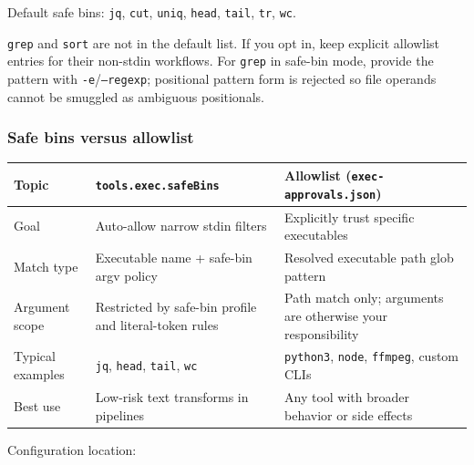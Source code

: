Default safe bins: \texttt{jq}, \texttt{cut}, \texttt{uniq}, \texttt{head}, \texttt{tail}, \texttt{tr}, \texttt{wc}.

\texttt{grep} and \texttt{sort} are not in the default list. If you opt in, keep explicit allowlist entries for
their non-stdin workflows.
For \texttt{grep} in safe-bin mode, provide the pattern with \texttt{-e}/\texttt{--regexp}; positional pattern form is
rejected so file operands cannot be smuggled as ambiguous positionals.

\subsubsection{Safe bins versus allowlist}



\begin{table}[h]
\centering
\small
\begin{tabular}{|l|l|l|}
\hline
Topic & \texttt{tools.exec.safeBins} & Allowlist (\texttt{exec-approvals.json}) \\
\hline
Goal & Auto-allow narrow stdin filters & Explicitly trust specific executables \\
\hline
Match type & Executable name + safe-bin argv policy & Resolved executable path glob pattern \\
\hline
Argument scope & Restricted by safe-bin profile and literal-token rules & Path match only; arguments are otherwise your responsibility \\
\hline
Typical examples & \texttt{jq}, \texttt{head}, \texttt{tail}, \texttt{wc} & \texttt{python3}, \texttt{node}, \texttt{ffmpeg}, custom CLIs \\
\hline
Best use & Low-risk text transforms in pipelines & Any tool with broader behavior or side effects \\
\hline
\end{tabular}
\end{table}



Configuration location:

